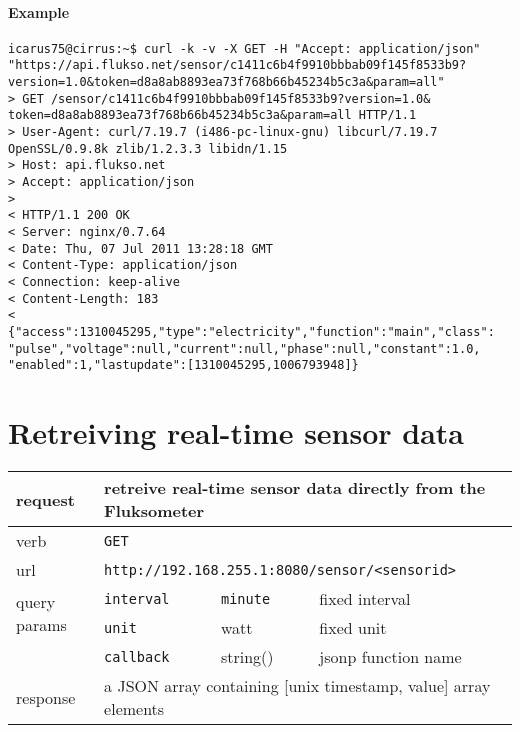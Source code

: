 \paragraph{Example}
\begin{Verbatim}
icarus75@cirrus:~$ curl -k -v -X GET -H "Accept: application/json"
"https://api.flukso.net/sensor/c1411c6b4f9910bbbab09f145f8533b9?
version=1.0&token=d8a8ab8893ea73f768b66b45234b5c3a&param=all"
> GET /sensor/c1411c6b4f9910bbbab09f145f8533b9?version=1.0&
token=d8a8ab8893ea73f768b66b45234b5c3a&param=all HTTP/1.1
> User-Agent: curl/7.19.7 (i486-pc-linux-gnu) libcurl/7.19.7
OpenSSL/0.9.8k zlib/1.2.3.3 libidn/1.15
> Host: api.flukso.net
> Accept: application/json
> 
< HTTP/1.1 200 OK
< Server: nginx/0.7.64
< Date: Thu, 07 Jul 2011 13:28:18 GMT
< Content-Type: application/json
< Connection: keep-alive
< Content-Length: 183
< 
{"access":1310045295,"type":"electricity","function":"main","class":
"pulse","voltage":null,"current":null,"phase":null,"constant":1.0,
"enabled":1,"lastupdate":[1310045295,1006793948]}
\end{Verbatim}

\section{Retreiving real-time sensor data}
\begin{tabular}{|l|l|l|p{5cm}|}

\hline
request & \multicolumn{3}{|l|}{retreive real-time sensor data directly from the Fluksometer} \\

\hline
verb & \multicolumn{3}{|l|}{\texttt{GET}} \\

\hline
url & \multicolumn{3}{|l|}{\texttt{http://192.168.255.1:8080/sensor/\textless sensorid\textgreater}} \\

\hline
\multirow{2}{*}{query params} & \texttt{interval} & \texttt{minute} & fixed interval \\
& \texttt{unit} & watt & fixed unit \\
& \texttt{{\small callback}} & string() & jsonp function name \\

\hline
response & \multicolumn{3}{|l|}{a JSON array containing [unix timestamp, value] array elements} \\

\hline

\end{tabular}


